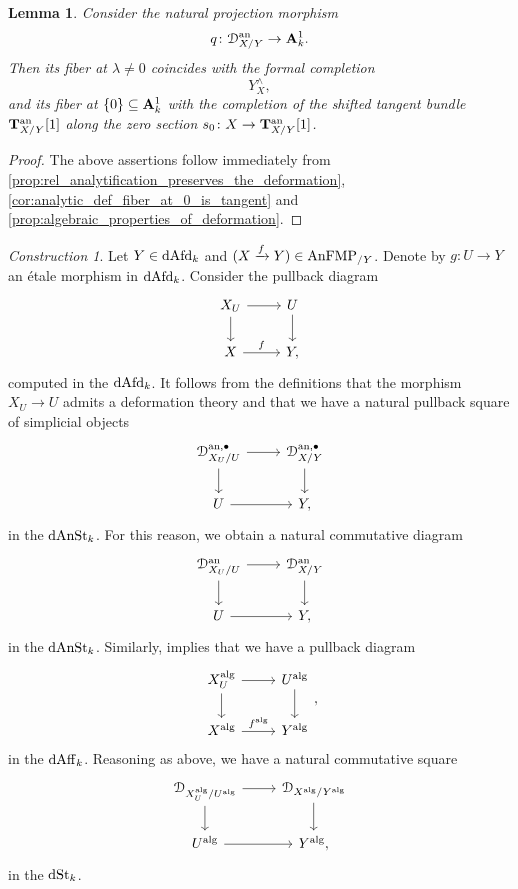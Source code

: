 \documentclass[10pt,a4paper,reqno]{amsart} %
\theoremstyle{plain}
\newtheorem{lem}[thm]{Lemma}
\theoremstyle{definition}
\theoremstyle{remark}
\numberwithin{equation}{section}
\newtheorem{construction}[thm]{Construction}
\begin{document}
\begin{lem} \label{lem:identification_of_non-archimedean_fibers}
    Consider the natural projection morphism
        \[
            q \colon \mathcal D_{X/ Y}^\mathrm{an} \to \mathbf A^1_k.
        \]
    Then its fiber at $\lambda \neq 0$ coincides with the formal completion
        \[
            Y^\wedge_X,  
        \]
    and its fiber at $\{ 0 \} \subseteq \mathbf A^1_k$ with the completion of the shifted tangent bundle $\mathbf T^\mathrm{an}_{X/ Y}[1]$ along the zero section $s_0 \colon X \to \mathbf T^\mathrm{an}_{X/ Y}[1]$.
\end{lem}

\begin{proof}
    The above assertions follow immediately from \cref{prop:rel_analytification_preserves_the_deformation}, \cref{cor:analytic_def_fiber_at_0_is_tangent} and \cref{prop:algebraic_properties_of_deformation}.
\end{proof}


\begin{construction} \label{const:pullbacks_of_deformations} Let $Y \in \mathrm{dAfd}_k$ and $(X \xrightarrow{f} Y) \in \mathrm{AnFMP}_{/ Y}$.
    Denote by $g \colon U \to Y$ an \'etale morphism in $\mathrm{dAfd}_k$. Consider the pullback diagram
        \[
        \begin{tikzcd}
            X_U \ar{r} \ar{d} & U \ar{d} \\
            X \ar{r}{f} & Y,  
        \end{tikzcd}
        \]
    computed in the \infcat $\mathrm{dAfd}_k$. It follows from the definitions that the morphism $X_U \to U$ admits a deformation theory and
    that we have a natural pullback square of simplicial objects
        \[
        \begin{tikzcd}
            \cD_{X_U/ U}^{\mathrm{an}, \bullet} \ar{r} \ar{d} & \cD_{X/Y}^{\mathrm{an}, \bullet} \ar{d} \\
            U \ar{r} & Y,
        \end{tikzcd}
        \]
    in the \infcat $\mathrm{dAnSt}_k$. For this reason, we obtain a natural commutative diagram
        \[
        \begin{tikzcd}
            \cD_{X_U/ U}\an \ar{r} \ar{d} & \cD_{X/ Y} \an \ar{d} \\
            U \ar{r} & Y,
        \end{tikzcd}
        \]
    in the \infcat $\mathrm{dAnSt}_k$. Similarly, \cite[Proposition 3.17]{Porta_Yu_Derived_non-archimedean_analytic_spaces}
    implies that we have a pullback diagram
        \[
        \begin{tikzcd}
            X_U\alg \ar{r} \ar{d} & U \alg \ar{d} \\
            X\alg \ar{r}{f\alg} & Y\alg
        \end{tikzcd},
        \]
    in the \infcat $\mathrm{dAff}_k$. Reasoning as above, we have a natural commutative square
      \[
        \begin{tikzcd}
        \cD_{X_U\alg/ U\alg} \ar{r} \ar{d} & \cD_{X\alg/ Y\alg} \ar{d} \\
        U\alg \ar{r} & Y \alg,  
       \end{tikzcd}
      \]
    in the \infcat $\mathrm{dSt}_k$.
\end{construction}
\end{document}
